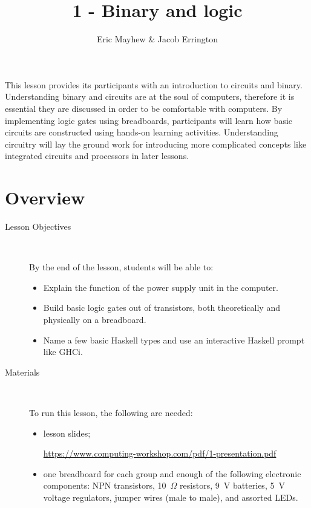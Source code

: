 \documentclass[11pt]{article}
\title{1 - Binary and logic}
\author{Eric Mayhew \& Jacob Errington}
\date{}
\newcommand{\cwurl}{https://www.computing-workshop.com/}
\newcommand{\cwpdf}{\cwurl pdf/}
\begin{document}
\maketitle
This lesson provides its participants with an introduction to circuits and
binary. Understanding binary and circuits are at the soul of computers,
therefore it is essential they are discussed in order to be comfortable with
computers. By implementing logic gates using breadboards, participants will learn how basic circuits are
constructed using hands-on learning activities. Understanding circuitry will lay the ground work for
introducing more complicated concepts like integrated circuits and processors in later lessons.

\section*{Overview}

\begin{description}
  \item[Lesson Objectives] ~

   By the end of the lesson, students will be able to:

  \begin{itemize}
    \item Explain the function of the power supply unit in the computer.

    \item Build basic logic gates out of transistors, both theoretically and
      physically on a breadboard.

    \item Name a few basic Haskell types and use an interactive Haskell prompt
      like GHCi.
  \end{itemize}

  \item [Materials]~

    To run this lesson, the following are needed:

    \begin{itemize}
      \item
        lesson slides;

        \url{\cwpdf 1-presentation.pdf}

      \item
        one breadboard for each group and enough of the following electronic
        components:
        NPN transistors,
        10~$\Omega$ resistors,
        9~V batteries,
        5~V voltage regulators,
        jumper wires (male to male),
        and assorted LEDs.

    \end{itemize}
\end{description}
\end{document}
